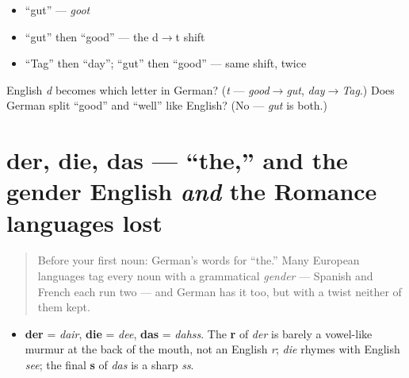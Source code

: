 \begin{itemize}
\raggedright
  \item \textquotedblleft{}gut\textquotedblright{} — \emph{goot}
  \item \textquotedblleft{}gut\textquotedblright{} then \textquotedblleft{}good\textquotedblright{} — the d$\to$t shift
  \item \textquotedblleft{}Tag\textquotedblright{} then \textquotedblleft{}day\textquotedblright{}; \textquotedblleft{}gut\textquotedblright{} then \textquotedblleft{}good\textquotedblright{} — same shift, twice
\end{itemize}

\begin{tcolorbox}[breakable,colback=teal!4,colframe=teal!35!black,title={Before you move on}]
English \emph{d} becomes which letter in German? (\emph{t} — \emph{good$\to$gut}, \emph{day$\to$Tag}.) Does German split \textquotedblleft{}good\textquotedblright{} and \textquotedblleft{}well\textquotedblright{} like English? (No — \emph{gut} is both.)
\end{tcolorbox}
\section[der / die / das]{der, die, das — \textquotedblleft{}the,\textquotedblright{} and the gender English \emph{and} the Romance languages lost}

\label{lesson:GE-C01-der-die-das}



\begin{quote}
Before your first noun: German's words for \textquotedblleft{}the.\textquotedblright{} Many European languages tag every noun with a grammatical \emph{gender} — Spanish and French each run two — and German has it too, but with a twist neither of them kept.
\end{quote}

\begin{sounds}
\begin{itemize}
\raggedright
  \item \textbf{der} = \emph{dair}, \textbf{die} = \emph{dee}, \textbf{das} = \emph{dahss}. The \textbf{r} of \emph{der} is barely a vowel-like murmur at the back of the mouth, not an English \emph{r}; \emph{die} rhymes with English \emph{see}; the final \textbf{s} of \emph{das} is a sharp \emph{ss}.
\end{itemize}
\end{sounds}

